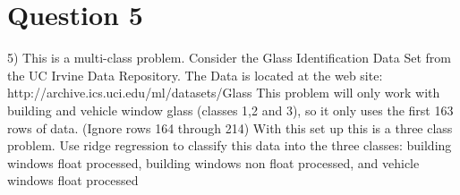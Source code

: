 \documentclass{article}
\begin{document}
\section*{Question 5}
5) This is a multi-class problem. Consider the Glass Identification Data Set
from the UC Irvine Data Repository. The Data is located at the web site:
http://archive.ics.uci.edu/ml/datasets/Glass%
This problem will only work with building and vehicle window glass (classes
1,2 and 3), so it only uses the first 163 rows of data. (Ignore rows 164
through 214) With this set up this is a three class problem. Use ridge
regression to classify this data into the three classes: building windows float
processed, building windows non float processed, and vehicle windows
float processed
\end{document}
